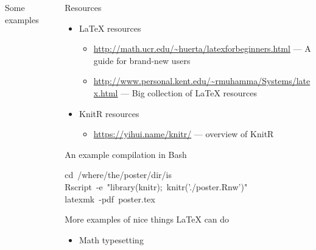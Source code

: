 \documentclass[capfont, final]{beamer}\usepackage[]{graphicx}\usepackage[]{color}
\makeatletter
\newcommand{\hlstr}[1]{\textcolor[rgb]{0.192,0.494,0.8}{#1}}%
\newcommand{\hlopt}[1]{\textcolor[rgb]{0,0,0}{#1}}%
\newcommand{\hlstd}[1]{\textcolor[rgb]{0.345,0.345,0.345}{#1}}%
\newcommand{\hlkwb}[1]{\textcolor[rgb]{0.69,0.353,0.396}{#1}}%
\newenvironment{kframe}{%
 \def\at@end@of@kframe{}%
 \ifinner\ifhmode%
  \def\at@end@of@kframe{\end{minipage}}%
  \begin{minipage}{\columnwidth}%
 \fi\fi%
 \def\FrameCommand##1{\hskip\@totalleftmargin \hskip-\fboxsep
 \colorbox{shadecolor}{##1}\hskip-\fboxsep
     \hskip-\linewidth \hskip-\@totalleftmargin \hskip\columnwidth}%
 \MakeFramed {\advance\hsize-\width
   \@totalleftmargin\z@ \linewidth\hsize
   \@setminipage}}%
 {\par\unskip\endMakeFramed%
 \at@end@of@kframe}
\newenvironment{knitrout}{}{} %
\newlength{\sepwid}
\newlength{\onecolwid}
\newlength{\twocolwid}
\makeatother
\begin{document}
\begin{frame}[t, fragile]
\begin{columns}[T]
\begin{column}{\twocolwid}
\begin{block}{Some examples}
				\end{block}
		\end{column} %
		\begin{column}{\sepwid} \end{column} %
		\begin{column}{\onecolwid} %
				\begin{block}{Resources}
					\begin{itemize}
						\item \LaTeX{} resources
						\begin{itemize}
							\item \url{http://math.ucr.edu/~huerta/latexforbeginners.html} --- A guide for brand-new users
							\item \url{http://www.personal.kent.edu/~rmuhamma/Systems/latex.html} --- Big collection of \LaTeX{} resources
						\end{itemize}
						\item KnitR resources 
						\begin{itemize}
								\item \url{https://yihui.name/knitr/} --- overview of KnitR
						\end{itemize}
					\end{itemize}
				\end{block}
				\begin{block}{An example compilation in Bash}
\begin{knitrout}\small
{}\color{fgcolor}\begin{kframe}
\noindent
\ttfamily
\hlstd{}\hlkwb{cd\ }\hlstd{}\hlopt{/}\hlstd{where}\hlopt{/}\hlstd{the}\hlopt{/}\hlstd{poster}\hlopt{/}\hlstd{dir}\hlopt{/}\hlstd{is\hspace*{\fill}\\
Rscript\ }\hlopt{{-}}\hlstd{e\ }\hlstr{"library(knitr);\ knitr('./poster.Rnw')"}\hlstd{\hspace*{\fill}\\
latexmk\ }\hlopt{{-}}\hlstd{pdf\ poster.tex}\hspace*{\fill}
\mbox{}
\normalfont
\end{kframe}
\end{knitrout}
				\end{block}
				\begin{block}{More examples of nice things \LaTeX{} can do}
					\begin{itemize}
							\item Math typesetting

\end{itemize}
\end{block}
\end{column}
\end{columns}
\end{frame}
\end{document}
